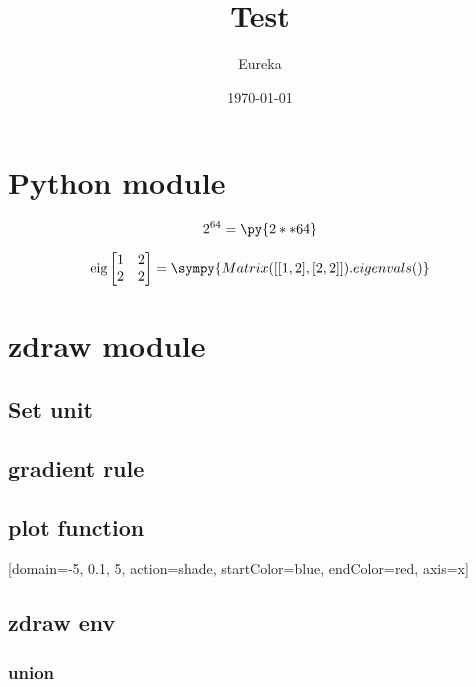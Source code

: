 \documentclass[hyper, class=article, layout={slide, aspect=16|9}]{zlatex}
\title{Test}
\author{Eureka}
\date{\today}
\begin{document}
\orimaketitle
\newpage

\section{Python module}
\lipsum[1]

\[
  2^{64} = \py{2**64}
\]

\[
  \text{eig}\begin{bmatrix}
    1 & 2 \\
    2 & 2
  \end{bmatrix} = \sympy{Matrix([[1, 2], [2, 2]]).eigenvals()}
\]

\newpage
\section{zdraw module}
\subsection{Set unit}
\lipsum[2]


\subsection{gradient rule}
\lipsum[3]

\zrule[width=10, startColor=red, step=1]\qquad


\newpage
\subsection{plot function}
\lipsum[4]

\zdrawSetPathWidth {5pt}
\begin{center}
  [domain={-5, 0.1, 5}, action=shade, startColor=blue, endColor=red, axis=x]
\end{center}
\zdrawSetPathWidth {.4pt}

\subsection{zdraw env}
\lipsum[5]

\subsubsection{union}
\begin{center}
\begin{zdraw}
  \rec {-10cm, -10cm}{10cm, 10cm}
  \usepath[fill]
\end{zdraw}
\end{center}
\end{document}
